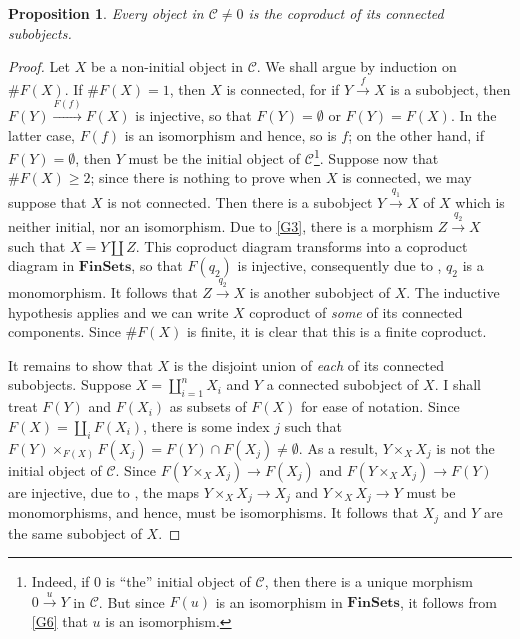\documentclass[10pt]{article}
\theoremstyle{thmstyle}
\newtheorem{proposition}[theorem]{Proposition}
\theoremstyle{defstyle}
\newcommand{\catFinSets}{\mathbf{FinSets}}
\newcommand{\scrC}{\mathscr{C}} %
\renewcommand{\ge}{\geqslant}
\begin{document}
\begin{proposition}
    Every object in $\scrC\ne 0$ is the coproduct of its connected subobjects.
\end{proposition}
\begin{proof}
    Let $X$ be a non-initial object in $\scrC$. We shall argue by induction on $\# F(X)$. If $\# F(X) = 1$, then $X$ is connected, for if $Y\xrightarrow{f} X$ is a subobject, then $F(Y)\xrightarrow{F(f)} F(X)$ is injective, so that $F(Y) = \emptyset$ or $F(Y) = F(X)$. In the latter case, $F(f)$ is an isomorphism and hence, so is $f$; on the other hand, if $F(Y) = \emptyset$, then $Y$ must be the initial object of $\scrC$\footnote{Indeed, if $0$ is ``the'' initial object of $\scrC$, then there is a unique morphism $0\xrightarrow{u} Y$ in $\scrC$. But since $F(u)$ is an isomorphism in $\catFinSets$, it follows from \ref{G6} that $u$ is an isomorphism.}. Suppose now that $\#F(X)\ge 2$; since there is nothing to prove when $X$ is connected, we may suppose that $X$ is not connected. Then there is a subobject $Y\xrightarrow{q_1} X$ of $X$ which is neither initial, nor an isomorphism. Due to \ref{G3}, there is a morphism $Z\xrightarrow{q_2} X$ such that $X = Y\coprod Z$. This coproduct diagram transforms into a coproduct diagram in $\catFinSets$, so that $F(q_2)$ is injective, consequently due to , $q_2$ is a monomorphism. It follows that $Z\xrightarrow{q_2} X$ is another subobject of $X$. The inductive hypothesis applies and we can write $X$ coproduct of \emph{some} of its connected components. Since $\# F(X)$ is finite, it is clear that this is a finite coproduct.

    It remains to show that $X$ is the disjoint union of \emph{each} of its connected subobjects. Suppose $X = \coprod_{i = 1}^n X_i$ and $Y$ a connected subobject of $X$. I shall treat $F(Y)$ and $F(X_i)$ as subsets of $F(X)$ for ease of notation. Since $F(X) = \coprod_i F(X_i)$, there is some index $j$ such that $F(Y)\times_{F(X)} F(X_j) = F(Y)\cap F(X_j)\ne\emptyset$. As a result, $Y\times_X X_j$ is not the initial object of $\scrC$. Since $F(Y\times_X X_j)\to F(X_j)$ and $F(Y\times_X X_j)\to F(Y)$  are injective, due to , the maps $Y\times_X X_j\to X_j$ and $Y\times_X X_j\to Y$ must be monomorphisms, and hence, must be isomorphisms. It follows that $X_j$ and $Y$ are the same subobject of $X$.
\end{proof}
\end{document}
